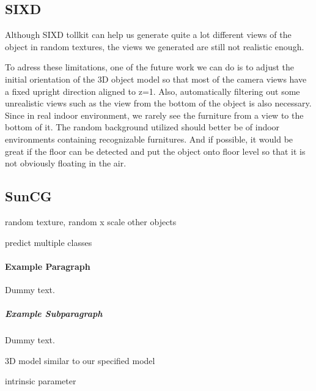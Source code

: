 \subsection{SIXD}
\label{sec:SIXD}
Although SIXD tollkit can help us generate quite a lot different views of the object in random textures, the views we generated are still not realistic enough.

To adress these limitations, one of the future work we can do is to adjust the initial orientation of the 3D object model so that most of the camera views have a fixed upright direction aligned to z=1. Also, automatically filtering out some unrealistic views such as the view from the bottom of the object is also necessary. Since in real indoor environment, we rarely see the furniture from a view to the bottom of it. The random background utilized should better be of indoor environments containing recognizable furnitures. And if possible, it would be great if the floor can be detected and put the object onto floor level so that it is not obviously floating in the air.

\subsection{SunCG}
random texture, random x scale
other objects

predict multiple classes


\paragraph{Example Paragraph}

Dummy text.

\subparagraph{Example Subparagraph}

Dummy text.


3D model similar to our specified model

 intrinsic parameter